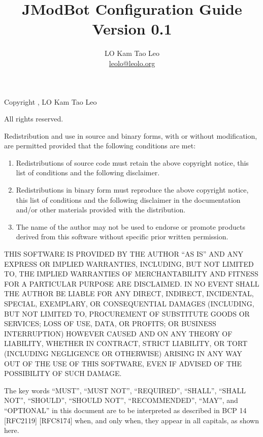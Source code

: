 \documentclass{report}
\title{JModBot Configuration Guide\\Version 0.1}
\author{LO Kam Tao Leo\\\href{mailto:leolo@leolo.org}{leolo@leolo.org}}
\begin{document}
	\maketitle
	
	Copyright , LO Kam Tao Leo
	
	All rights reserved.
	
	Redistribution and use in source and binary forms, with or without
	modification, are permitted provided that the following conditions are
	met:
	\begin{enumerate}
		\item  Redistributions of source code must retain the above copyright
	notice, this list of conditions and the following disclaimer. 
	
		\item Redistributions in binary form must reproduce the above copyright
	notice, this list of conditions and the following disclaimer in
	the documentation and/or other materials provided with the
	distribution.  
	
		\item The name of the author may not be used to
	endorse or promote products derived from this software without
	specific prior written permission.
	\end{enumerate}

	THIS SOFTWARE IS PROVIDED BY THE AUTHOR ``AS IS'' AND ANY EXPRESS OR
	IMPLIED WARRANTIES, INCLUDING, BUT NOT LIMITED TO, THE IMPLIED
	WARRANTIES OF MERCHANTABILITY AND FITNESS FOR A PARTICULAR PURPOSE ARE
	DISCLAIMED. IN NO EVENT SHALL THE AUTHOR BE LIABLE FOR ANY DIRECT,
	INDIRECT, INCIDENTAL, SPECIAL, EXEMPLARY, OR CONSEQUENTIAL DAMAGES
	(INCLUDING, BUT NOT LIMITED TO, PROCUREMENT OF SUBSTITUTE GOODS OR
	SERVICES; LOSS OF USE, DATA, OR PROFITS; OR BUSINESS INTERRUPTION)
	HOWEVER CAUSED AND ON ANY THEORY OF LIABILITY, WHETHER IN CONTRACT,
	STRICT LIABILITY, OR TORT (INCLUDING NEGLIGENCE OR OTHERWISE) ARISING
	IN ANY WAY OUT OF THE USE OF THIS SOFTWARE, EVEN IF ADVISED OF THE
	POSSIBILITY OF SUCH DAMAGE. 
	
	\vspace{0.5in}
	\noindent\makebox[\linewidth]{\rule{\textwidth}{0.4pt}}
	\vspace{0.5in}
	
	The key words ``MUST'', ``MUST NOT'', ``REQUIRED'', ``SHALL'', ``SHALL
	NOT'', ``SHOULD'', ``SHOULD NOT'', ``RECOMMENDED'',  ``MAY'', and
	``OPTIONAL'' in this document are to be interpreted as
      described in BCP 14 [RFC2119] [RFC8174] when, and only when, they
      appear in all capitals, as shown here.
	\tableofcontents
\end{document}
